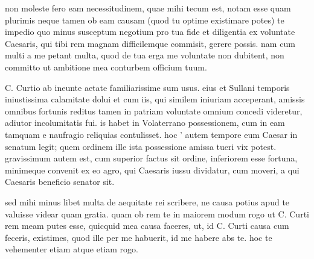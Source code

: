 


 non moleste fero eam necessitudinem, quae mihi tecum est, notam esse quam plurimis neque tamen ob eam causam (quod tu optime existimare potes) te impedio quo minus susceptum negotium pro tua fide et diligentia ex voluntate Caesaris, qui tibi rem magnam difficilemque commisit, gerere possis. nam cum multi a me petant multa, quod de tua erga me voluntate non dubitent, non committo ut ambitione mea conturbem officium tuum.

 C. Curtio ab ineunte aetate familiarissime sum usus. eius et Sullani temporis iniustissima calamitate dolui et cum iis, qui similem iniuriam acceperant, amissis omnibus fortunis reditus tamen in patriam voluntate omnium concedi videretur, adiutor incolumitatis fui. is habet in Volaterrano possessionem, cum in eam tamquam e naufragio reliquias contulisset. hoc ' autem tempore eum Caesar in senatum legit; quem ordinem ille ista possessione amissa tueri vix potest. gravissimum autem est, cum superior factus sit ordine, inferiorem esse fortuna, minimeque convenit ex eo agro, qui Caesaris iussu dividatur, cum moveri, a qui Caesaris beneficio senator sit.

 sed mihi minus libet multa de aequitate rei scribere, ne causa potius apud te valuisse videar quam gratia. quam ob rem te in maiorem modum rogo ut C. Curti rem meam putes esse, quicquid mea causa faceres, ut, id C. Curti causa cum feceris, existimes, quod ille per me habuerit, id me habere abs te. hoc te vehementer etiam atque etiam rogo.
